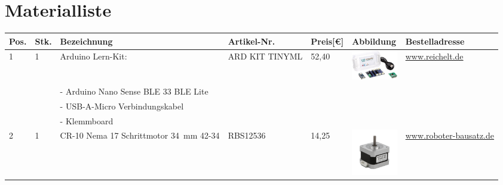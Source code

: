 \chapter{Materialliste} \label{MLL}
\begin{center}
	\fontsize{8}{10}\selectfont
	\begin{tabularx}{\linewidth}{|p{0.4cm}|p{0.4cm}|X|X|p{1cm}|X|X|}
		\hline 
		\textbf{Pos.} & \textbf{Stk.} & \textbf{Bezeichnung} & \textbf{Artikel-Nr.}& \textbf{Preis[€]} & \textbf{Abbildung} & \textbf{Bestelladresse} \\ \hline
		1 & 1 & Arduino Lern-Kit: & ARD KIT TINYML & 52,40 & 
			
 \includegraphics[width=2cm]{Images/Material/Arduino.png} 	  & \href{https://www.reichelt.de/sg/de/arduino-lern-kit-tiny-machine-ard-kit-tinyml-p304338.html}{www.reichelt.de} \\
		&   & - Arduino Nano Sense BLE 33 BLE Lite & & & \\ 
		&   &- USB-A-Micro Verbindungskabel & & & \\
		&   &- Klemmboard & & & \\
		\hline
		2 & 1 & CR-10 Nema 17 Schrittmotor 34\ mm 42-34 & RBS12536 & 14,25  & \includegraphics[width=2cm]{Images/Material/RBS12536.png} & \href{https://www.roboter-bausatz.de/p/cr-10-nema-17-schrittmotor-34mm-42-34}{www.roboter-bausatz.de} \\
		\hline
		

\end{tabularx}
\end{center}
